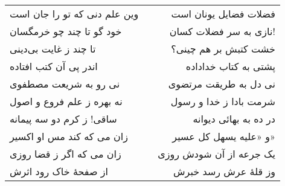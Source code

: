 \begin{center}
\begin{longtable}{l p{0.5cm} r}
\\
وین علم دنی که تو را جان است
&&
فضلات فضایل یونان است
\\
خود گو تا چند چو خرمگسان
&&
نازی به سر فضلات کسان!
\\
تا چند ز غایت بی‌دینی
&&
خشت کتبش بر هم چینی؟
\\
اندر پی آن کتب افتاده
&&
پشتی به کتاب خداداده
\\
نی رو به شریعت مصطفوی
&&
نی دل به طریقت مرتضوی
\\
نه بهره ز علم فروع و اصول
&&
شرمت بادا ز خدا و رسول
\\
ساقی! ز کرم دو سه پیمانه
&&
در ده به بهائی دیوانه
\\
زان می که کند مس او اکسیر
&&
و «علیه یسهل کل عسیر»
\\
زان می که اگر ز قضا روزی
&&
یک جرعه از آن شودش روزی
\\
از صفحهٔ خاک رود اثرش
&&
وز قلهٔ عرش رسد خبرش
\\
\end{longtable}
\end{center}
